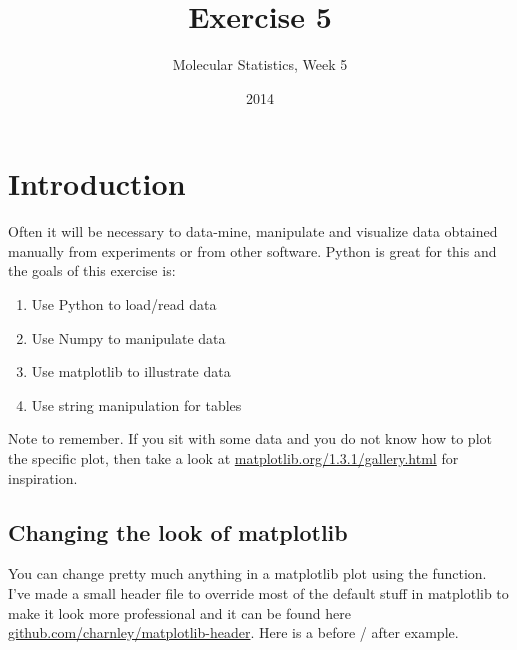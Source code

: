 \documentclass{article}
\title{Exercise 5}
\author{Molecular Statistics, Week 5}
\date{2014}
\begin{document}

\maketitle

\section{Introduction}

Often it will be necessary to data-mine, manipulate and visualize data obtained manually from experiments or from other software.
Python is great for this and the goals of this exercise is:

\begin{enumerate}
    \item Use Python to load/read data

    \item Use Numpy to manipulate data

    \item Use matplotlib to illustrate data

    \item Use string manipulation for tables


\end{enumerate}


Note to remember.
If you sit with some data and you do not know how to plot the specific plot, then take a look at
\href{http://matplotlib.org/1.3.1/gallery.html}{matplotlib.org/1.3.1/gallery.html} for inspiration.



\subsection{Changing the look of matplotlib}

You can change pretty much anything in a matplotlib plot using the  function.
I've made a small header file to override most of the default stuff in matplotlib to make it look more professional and it can be found here
\href{https://github.com/charnley/matplotlib-header}{github.com/charnley/matplotlib-header}.
Here is a before / after example.
\end{document}
